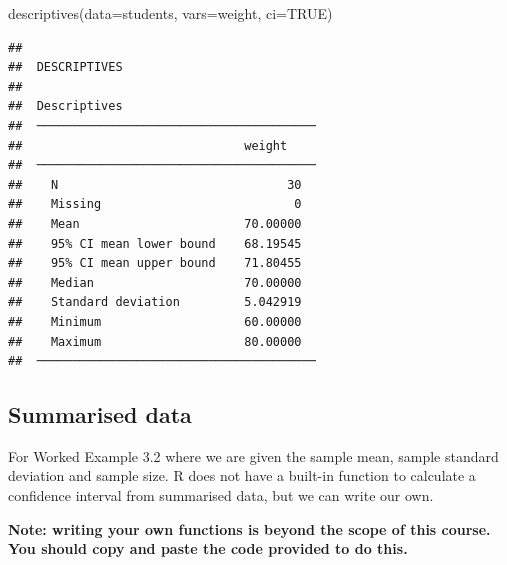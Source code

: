 \documentclass[
]{memoir}
\newenvironment{Shaded}{\begin{snugshade}}{\end{snugshade}}
\newcommand{\AttributeTok}[1]{\textcolor[rgb]{0.77,0.63,0.00}{#1}}
\newcommand{\ConstantTok}[1]{\textcolor[rgb]{0.00,0.00,0.00}{#1}}
\newcommand{\FunctionTok}[1]{\textcolor[rgb]{0.00,0.00,0.00}{#1}}
\newcommand{\NormalTok}[1]{#1}
\begin{document}
\begin{Shaded}
\begin{Highlighting}[]
\FunctionTok{descriptives}\NormalTok{(}\AttributeTok{data=}\NormalTok{students, }\AttributeTok{vars=}\NormalTok{weight, }\AttributeTok{ci=}\ConstantTok{TRUE}\NormalTok{)}
\end{Highlighting}
\end{Shaded}

\begin{verbatim}
## 
##  DESCRIPTIVES
## 
##  Descriptives                            
##  ─────────────────────────────────────── 
##                               weight     
##  ─────────────────────────────────────── 
##    N                                30   
##    Missing                           0   
##    Mean                       70.00000   
##    95% CI mean lower bound    68.19545   
##    95% CI mean upper bound    71.80455   
##    Median                     70.00000   
##    Standard deviation         5.042919   
##    Minimum                    60.00000   
##    Maximum                    80.00000   
##  ───────────────────────────────────────
\end{verbatim}

\hypertarget{summarised-data}{%
\subsection{Summarised data}\label{summarised-data}}

For Worked Example 3.2 where we are given the sample mean, sample standard deviation and sample size. R does not have a built-in function to calculate a confidence interval from summarised data, but we can write our own.

\textbf{Note: writing your own functions is beyond the scope of this course. You should copy and paste the code provided to do this.}
\end{document}
